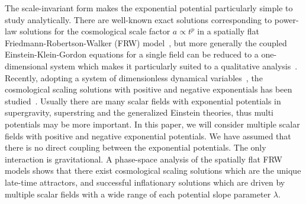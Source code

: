 \documentclass[a4paper,12pt]{article}
\begin{document}
The scale-invariant form makes the exponential potential
particularly simple to study analytically. There are well-known
exact solutions corresponding to power-law solutions for the
cosmological scale factor $a\propto t^p$ in a spatially flat
Friedmann-Robertson-Walker (FRW) model~\cite{FLM},
but more generally the coupled
Einstein-Klein-Gordon equations for a single field can be reduced
to a one-dimensional system which makes it particularly suited to
a qualitative analysis~\cite{JJH,CLW}. Recently, adopting a system
of dimensionless dynamical variables~\cite{EW},
the cosmological scaling solutions with positive and negative
exponentials has been studied~\cite{HW}. Usually there are many
scalar fields with exponential potentials in supergravity,
superstring and the generalized Einstein theories, thus multi
potentials may be more important.
In this paper, we will consider multiple scalar fields with
positive and negative exponential potentials. We have assumed that
there is no direct coupling between the exponential potentials.
The only interaction is gravitational. A phase-space analysis of
the spatially flat FRW models shows that there exist cosmological
scaling solutions which are the unique late-time attractors, and
successful inflationary solutions which are driven by multiple
scalar fields with a wide range of each potential slope parameter
$\lambda$.
\end{document}
